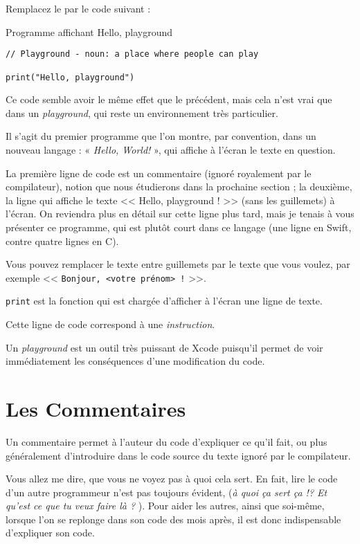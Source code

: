 Remplacez le par le code suivant :
\begin{listing}[H]
\caption{Programme affichant \og Hello, playground \fg{}}
\begin{verbatim}
// Playground - noun: a place where people can play

print("Hello, playground")
\end{verbatim}
\end{listing}

Ce code semble avoir le même effet que le précédent,
mais cela n'est vrai que dans un \emph{playground},
qui reste un environnement très particulier.

Il s’agit du premier programme que l’on montre,
par convention, dans un nouveau langage :
« \emph{Hello, World!} », qui affiche à l’écran le texte en question.

La première ligne de code est un commentaire
(ignoré royalement par le compilateur),
notion que nous étudierons dans la prochaine section ;
la deuxième, la ligne qui affiche le texte << Hello, playground ! >>
(sans les guillemets) à l’écran.
On reviendra plus en détail sur cette ligne plus tard,
mais je tenais à vous présenter ce programme,
qui est plutôt court dans ce langage
(une ligne en Swift, contre quatre lignes en C).

Vous pouvez remplacer le texte entre guillemets par le texte que vous voulez,
par exemple << \verb"Bonjour, <votre prénom> !" >>.

\texttt{print} est la fonction
qui est chargée d’afficher à l’écran une ligne de texte.

Cette ligne de code correspond à une \emph{instruction}.

Un \emph{playground} est un outil très puissant de Xcode
puisqu’il permet de voir immédiatement
les conséquences d’une modification du code.
\section{Les Commentaires}
Un commentaire permet à l’auteur du code d’expliquer ce qu’il fait,
ou plus généralement d’introduire dans le code source
du texte ignoré par le compilateur.

Vous allez me dire, que vous ne voyez pas à quoi cela sert.
En fait, lire le code d’un autre programmeur n’est pas toujours évident,
(\og \emph{à quoi ça sert ça !? Et qu’est ce que tu veux faire là ?} \fg{}).
Pour aider les autres, ainsi que soi-même,
lorsque l'on se replonge dans son code des mois après,
il est donc indispensable d’expliquer son code.

